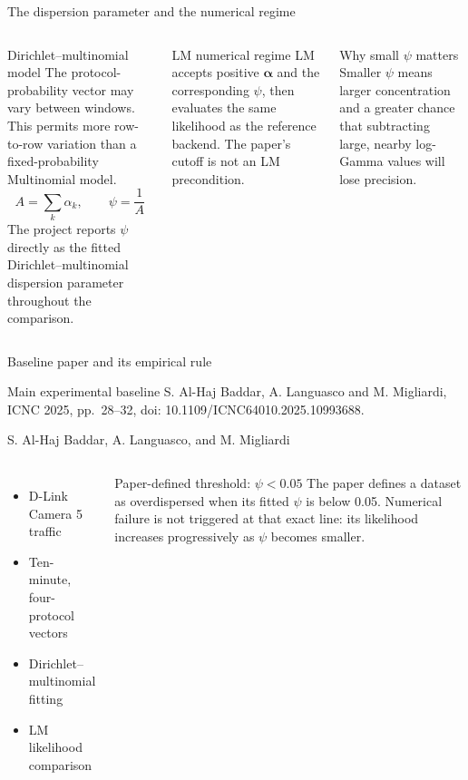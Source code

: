 \documentclass[aspectratio=169,10pt]{beamer}
\begin{document}
\begin{frame}{The dispersion parameter and the numerical regime}
\begin{columns}[T,onlytextwidth]
\begin{block}{Dirichlet--multinomial model}
The protocol-probability vector may vary between windows. This permits more
row-to-row variation than a fixed-probability Multinomial model.
\[
A=\sum_k\alpha_k,
\qquad \psi=\frac{1}{A}
\]
The project reports $\psi$ directly as the fitted Dirichlet--multinomial
dispersion parameter throughout the comparison.
\end{block}

\begin{exampleblock}{LM numerical regime}
LM accepts positive $\boldsymbol{\alpha}$ and the corresponding $\psi$, then
evaluates the same likelihood as the reference backend. The paper's cutoff is
not an LM precondition.
\end{exampleblock}

\begin{alertblock}{Why small $\psi$ matters}
Smaller $\psi$ means larger concentration and a greater chance that subtracting
large, nearby log-Gamma values will lose precision.
\end{alertblock}
\end{columns}
\end{frame}

\begin{frame}{Baseline paper and its empirical rule}
\begin{block}{Main experimental baseline}
S. Al-Haj Baddar, A. Languasco and M. Migliardi, ICNC 2025,
pp.~28--32, doi: 10.1109/ICNC64010.2025.10993688.\par
\smallskip
S. Al-Haj Baddar, A. Languasco, and M. Migliardi
\end{block}

\begin{columns}[T,onlytextwidth]
\begin{itemize}
  \item D-Link Camera 5 traffic
  \item Ten-minute, four-protocol vectors
  \item Dirichlet--multinomial fitting
  \item LM likelihood comparison
\end{itemize}

\begin{alertblock}{Paper-defined threshold: $\psi<0.05$}
The paper defines a dataset as overdispersed when its fitted $\psi$ is below
0.05. Numerical failure is not triggered at that exact line: its likelihood
increases progressively as $\psi$ becomes smaller.
\end{alertblock}
\end{columns}
\end{frame}
\end{document}

